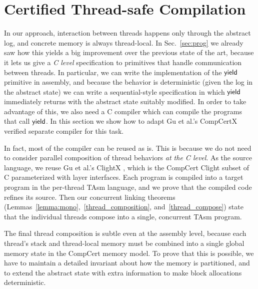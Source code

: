 
\section{Certified Thread-safe Compilation}
\label{sec:comp}

In our approach, interaction between threads happens only through the 
abstract log, and concrete memory is always thread-local.
In Sec.~\ref{sec:prog} we already saw how this yields a big
improvement over the previous state of the art, because it lets us
give a \emph{C level} specification to primitives that handle
communication between threads. In particular, we can write the
implementation of the $\mathsf{yield}$ primitive in assembly, and because the
behavior is deterministic (given the log in the abstract state) we can
write a sequential-style specification in which $\mathsf{yield}$ immediately
returns with the abstract state suitably modified.
In order to take advantage of this, we also need a C compiler which
can compile the programs that call $\mathsf{yield}$. 
In this section we show how to adapt Gu et al.'s CompCertX verified
separate compiler \cite[\S 6]{dscal15} for this task.

In fact, most of the compiler can be reused as is. This is because we
do not need to consider parallel composition of thread behaviors
\emph{at the C level}. As the source language, we reuse Gu et al.'s
ClightX \cite[\S 4]{dscal15}, which is the CompCert
Clight subset of C parameterized with layer interfaces.
Each program is compiled into a
target program in the per-thread TAsm language, and we prove that the
compiled code refines its source. Then our concurrent linking
theorems (Lemmas~\ref{lemma:mono},~\ref{thread_composition}, and~\ref{thread_compose})
state that the individual threads compose into a
single, concurrent TAsm program. %

The final thread composition is subtle even at the assembly level,
because each thread's stack and thread-local memory must be combined
into a single global memory state in the CompCert memory model. To
prove that this is possible, we have to maintain a detailed invariant
about how the memory is partitioned, and to extend the abstract state
with extra information to make block allocations deterministic.



